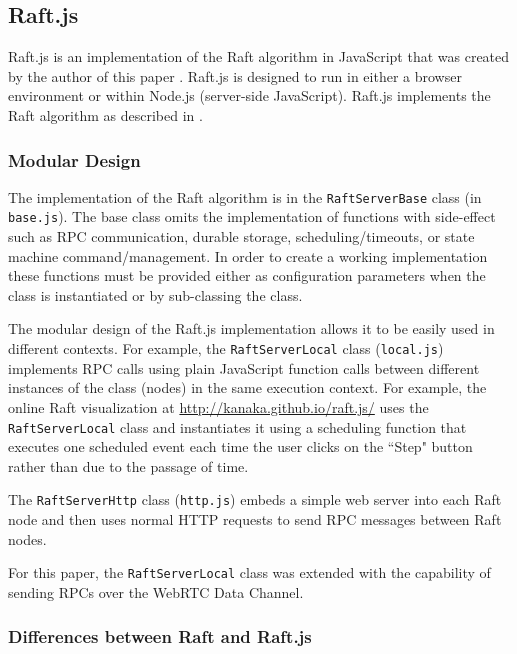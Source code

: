 \documentclass[9pt]{extarticle}
\begin{document}
\begin{multicols}{2}

\subsection{Raft.js}

Raft.js is an implementation of the Raft algorithm in JavaScript that
was created by the author of this paper \cite{raft.js}.  Raft.js is
designed to run in either a browser environment or within Node.js
(server-side JavaScript). Raft.js implements the Raft algorithm as
described in \cite[Consensus:~Diego]{raft_thesis:ongaro14}.

\subsubsection{Modular Design}

The implementation of the Raft algorithm is in the
\texttt{RaftServerBase} class (in \texttt{base.js}). The base class
omits the implementation of functions with side-effect such as RPC
communication, durable storage, scheduling/timeouts, or state machine
command/management. In order to create a working implementation these
functions must be provided either as configuration parameters when the
class is instantiated or by sub-classing the class.

The modular design of the Raft.js implementation allows it to be
easily used in different contexts. For example, the \texttt{RaftServerLocal}
class (\texttt{local.js}) implements RPC calls using plain JavaScript function
calls between different instances of the class (nodes) in the same
execution context. For example, the online Raft visualization at
\href{http://kanaka.github.io/raft.js/}{http://kanaka.github.io/raft.js/}
\cite{raft.js:visualization} uses the \texttt{RaftServerLocal} class
and instantiates it using a scheduling function that executes one
scheduled event each time the user clicks on the ``Step" button rather
than due to the passage of time.

The \texttt{RaftServerHttp} class (\texttt{http.js}) embeds a simple
web server into each Raft node and then uses normal HTTP requests to
send RPC messages between Raft nodes.

For this paper, the \texttt{RaftServerLocal} class was extended with
the capability of sending RPCs over the WebRTC Data Channel.

\subsubsection{Differences between Raft and Raft.js}


\end{multicols}
\end{document}
